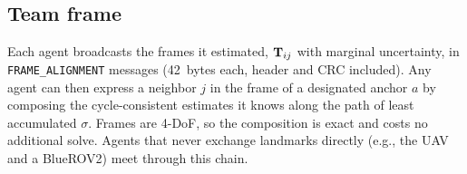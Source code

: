 \subsection{Team frame}
Each agent broadcasts the frames it estimated, $\mathbf{T}_{ij}$ with marginal uncertainty, in
\texttt{FRAME\_ALIGNMENT} messages (42~bytes each, header and CRC included). Any agent can then express a
neighbor $j$ in the frame of a designated anchor $a$ by composing the cycle-consistent estimates
it knows along the path of least accumulated $\sigma$. Frames are 4-DoF, so the composition is
exact and costs no additional solve. Agents that never exchange landmarks directly (e.g., the UAV and a
BlueROV2) meet through this chain.
